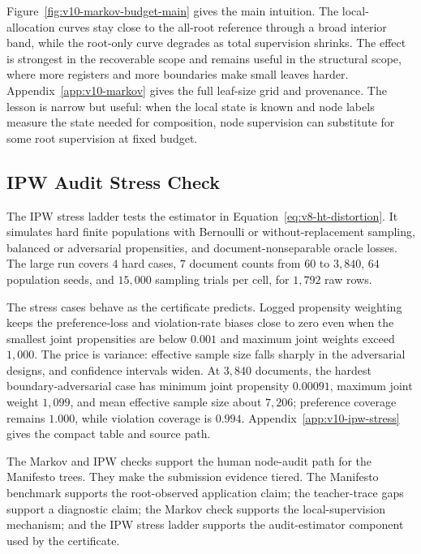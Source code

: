 Figure~\ref{fig:v10-markov-budget-main} gives the main intuition. The
local-allocation curves stay close to the all-root reference through a
broad interior band, while the root-only curve degrades as total
supervision shrinks. The effect is strongest in the recoverable scope
and remains useful in the structural scope, where more registers and
more boundaries make small leaves harder. Appendix~\ref{app:v10-markov}
gives the full leaf-size grid and provenance. The lesson is narrow but
useful: when the local state is known and node labels measure the state
needed for composition, node supervision can substitute for some root
supervision at fixed budget.

\subsection{IPW Audit Stress Check}
\label{sec:v10-ipw-check}

The IPW stress ladder tests the estimator in
Equation~\eqref{eq:v8-ht-distortion}. It simulates hard finite
populations with Bernoulli or without-replacement sampling, balanced
or adversarial propensities, and document-nonseparable oracle losses.
The large run covers \(4\) hard cases, \(7\) document counts from
\(60\) to \(3{,}840\), \(64\) population seeds, and \(15{,}000\)
sampling trials per cell, for \(1{,}792\) raw rows.

The stress cases behave as the certificate predicts. Logged
propensity weighting keeps the preference-loss and violation-rate
biases close to zero even when the smallest joint propensities are
below \(0.001\) and maximum joint weights exceed \(1{,}000\). The
price is variance: effective sample size falls sharply in the
adversarial designs, and confidence intervals widen. At
\(3{,}840\) documents, the hardest boundary-adversarial case has
minimum joint propensity \(0.00091\), maximum joint weight
\(1{,}099\), and mean effective sample size about \(7{,}206\);
preference coverage remains \(1.000\), while violation coverage is
\(0.994\). Appendix~\ref{app:v10-ipw-stress} gives the compact
table and source path.

The Markov and IPW checks support the human node-audit path for the
Manifesto trees. They make the submission evidence tiered. The
Manifesto benchmark supports the root-observed application claim; the
teacher-trace gaps support a diagnostic claim; the Markov check
supports the local-supervision mechanism; and the IPW stress ladder
supports the audit-estimator component used by the certificate.
